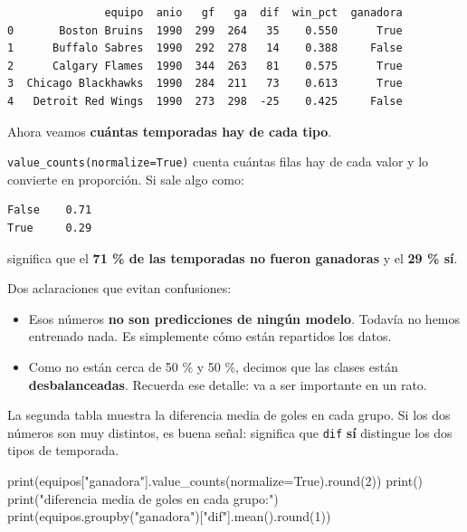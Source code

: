 \documentclass[
]{article}
\newenvironment{Shaded}{}{}
\newcommand{\BuiltInTok}[1]{\textcolor[rgb]{0.00,0.50,0.00}{#1}}
\newcommand{\DecValTok}[1]{\textcolor[rgb]{0.25,0.63,0.44}{#1}}
\newcommand{\NormalTok}[1]{#1}
\newcommand{\OperatorTok}[1]{\textcolor[rgb]{0.40,0.40,0.40}{#1}}
\newcommand{\StringTok}[1]{\textcolor[rgb]{0.25,0.44,0.63}{#1}}
\newcommand{\VariableTok}[1]{\textcolor[rgb]{0.10,0.09,0.49}{#1}}
\providecommand{\tightlist}{%
  \setlength{\itemsep}{0pt}\setlength{\parskip}{0pt}}
\begin{document}
\begin{verbatim}
               equipo  anio   gf   ga  dif  win_pct  ganadora
0       Boston Bruins  1990  299  264   35    0.550      True
1      Buffalo Sabres  1990  292  278   14    0.388     False
2      Calgary Flames  1990  344  263   81    0.575      True
3  Chicago Blackhawks  1990  284  211   73    0.613      True
4   Detroit Red Wings  1990  273  298  -25    0.425     False
\end{verbatim}

\protect{}\label{C-e9HEOAnYyO}
Ahora veamos \textbf{cuántas temporadas hay de cada tipo}.

\texttt{value\_counts(normalize=True)} cuenta cuántas filas hay de cada
valor y lo convierte en proporción. Si sale algo como:

\begin{verbatim}
False    0.71
True     0.29
\end{verbatim}

significa que el \textbf{71 \% de las temporadas no fueron ganadoras} y
el \textbf{29 \% sí}.

Dos aclaraciones que evitan confusiones:

\begin{itemize}
\tightlist
\item
  Esos números \textbf{no son predicciones de ningún modelo}. Todavía no
  hemos entrenado nada. Es simplemente cómo están repartidos los datos.
\item
  Como no están cerca de 50 \% y 50 \%, decimos que las clases están
  \textbf{desbalanceadas}. Recuerda ese detalle: va a ser importante en
  un rato.
\end{itemize}

La segunda tabla muestra la diferencia media de goles en cada grupo. Si
los dos números son muy distintos, es buena señal: significa que
\texttt{dif} \textbf{sí} distingue los dos tipos de temporada.

\protect{}\label{ceplGF5TnYyP}
\begin{Shaded}
\begin{Highlighting}[]
\BuiltInTok{print}\NormalTok{(equipos[}\StringTok{"ganadora"}\NormalTok{].value\_counts(normalize}\OperatorTok{=}\VariableTok{True}\NormalTok{).}\BuiltInTok{round}\NormalTok{(}\DecValTok{2}\NormalTok{))}
\BuiltInTok{print}\NormalTok{()}
\BuiltInTok{print}\NormalTok{(}\StringTok{"diferencia media de goles en cada grupo:"}\NormalTok{)}
\BuiltInTok{print}\NormalTok{(equipos.groupby(}\StringTok{"ganadora"}\NormalTok{)[}\StringTok{"dif"}\NormalTok{].mean().}\BuiltInTok{round}\NormalTok{(}\DecValTok{1}\NormalTok{))}
\end{Highlighting}
\end{Shaded}
\end{document}

